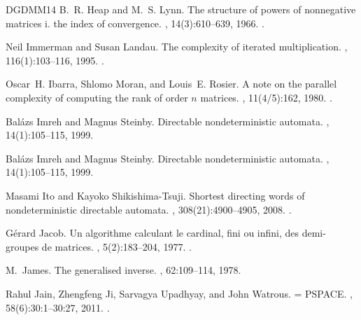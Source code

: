 \documentclass[11pt,a4paper]{amsart}
\theoremstyle{plain}
\theoremstyle{definition}
\theoremstyle{defC}
\theoremstyle{thmC}
\theoremstyle{plain}
\numberwithin{equation}{section}
\begin{document}
\begin{thebibliography}{DGDMM14}
B.~R. Heap and M.~S. Lynn.
\newblock The structure of powers of nonnegative matrices i. the index of
  convergence.
, 14(3):610--639, 1966.
\newblock \href {https://doi.org/10.1137/0114052} {}.

Neil Immerman and Susan Landau.
\newblock The complexity of iterated multiplication.
, 116(1):103--116, 1995.
\newblock \href {https://doi.org/10.1006/INCO.1995.1007}
  {}.

Oscar~H. Ibarra, Shlomo Moran, and Louis~E. Rosier.
\newblock A note on the parallel complexity of computing the rank of order $n$
  matrices.
, 11(4/5):162, 1980.
\newblock \href {https://doi.org/10.1016/0020-0190(80)90042-3}
  {}.

Bal\'{a}zs Imreh and Magnus Steinby.
\newblock Directable nondeterministic automata.
, 14(1):105--115, 1999.

Bal{\'{a}}zs Imreh and Magnus Steinby.
\newblock Directable nondeterministic automata.
, 14(1):105--115, 1999.

Masami Ito and Kayoko Shikishima{-}Tsuji.
\newblock Shortest directing words of nondeterministic directable automata.
, 308(21):4900--4905, 2008.
\newblock \href {https://doi.org/10.1016/J.DISC.2007.09.010}
  {}.

G{\'{e}}rard Jacob.
\newblock Un algorithme calculant le cardinal, fini ou infini, des demi-groupes
  de matrices.
, 5(2):183--204, 1977.
\newblock \href {https://doi.org/10.1016/0304-3975(77)90006-8}
  {}.

M.~James.
\newblock The generalised inverse.
, 62:109--114, 1978.

Rahul Jain, Zhengfeng Ji, Sarvagya Upadhyay, and John Watrous.
 = {PSPACE}.
, 58(6):30:1--30:27, 2011.
\newblock \href {https://doi.org/10.1145/2049697.2049704}
  {}.


\end{thebibliography}
\end{document}
